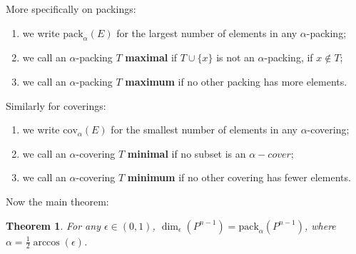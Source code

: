 \documentclass[a4paper, 10pt]{article}
\newtheorem{theorem}{Theorem}
\newcommand{\PN}{P^{n-1}}
\newcommand{\pack}{\text{pack}_{\alpha}}
\newcommand{\cov}{\text{cov}_{\alpha}}
\begin{document}
  More specifically on packings:
  \begin{enumerate}
    \item we write $\pack(E)$ for the largest number of elements in any
      $\alpha$-packing;
    \item we call an $\alpha$-packing $T$ \textbf{maximal} if $T \cup \{x\}$ is
      not an $\alpha$-packing, if $x \notin T$;
    \item we call an $\alpha$-packing $T$ \textbf{maximum} if no other packing
      has more elements.
  \end{enumerate}

  Similarly for coverings:
  \begin{enumerate}
    \item we write $\cov(E)$ for the smallest number of elements in any
      $\alpha$-covering;
    \item we call an $\alpha$-covering $T$ \textbf{minimal} if no subset is an
      $\alpha-cover$;
    \item we call an $\alpha$-covering $T$ \textbf{minimum} if no other covering
      has fewer elements.
  \end{enumerate}

  \begin{figure}
    
  \end{figure}

  Now the main theorem:
  \begin{theorem}
    For any $\epsilon \in (0,1)$, $\dim_{\epsilon}(\PN) = \pack(\PN)$, where
    $\alpha = \frac{1}{2}\arccos(\epsilon)$.
  \end{theorem}


  \newpage
\end{document}
